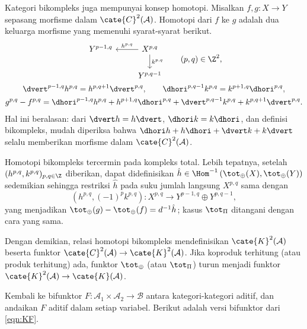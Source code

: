 Kategori bikompleks juga mempunyai konsep homotopi. Misalkan
$f,g:X\to Y$ sepasang morfisme dalam $\cate{C}^2(\mathcal{A})$. Homotopi
dari $f$ ke $g$ adalah dua keluarga morfisme yang memenuhi syarat-syarat
berikut. 
\begin{equation*}\begin{gathered}
\begin{tikzcd}
	Y^{p-1, q} & X^{p,q} \arrow[l, "{h^{p,q}}"'] \arrow[d, "{k^{p, q}}"] \\
	& Y^{p, q-1}
\end{tikzcd} \qquad (p,q) \in \Z^2 , \\
	\dvert^{p-1, q} h^{p, q} = h^{p, q+1} \dvert^{p, q}, \qquad \dhori^{p, q-1} k^{p,q} = k^{p+1, q} \dhori^{p,q}, \\
	g^{p,q} - f^{p, q} = \dhori^{p-1, q} h^{p,q} + h^{p+1, q} \dhori^{p,q} + \dvert^{p, q-1} k^{p,q} + k^{p, q+1} \dvert^{p,q}.
\end{gathered}\end{equation*}
Hal ini beralasan: dari $\dvert h=h\dvert$, $\dhori k=k\dhori$, dan definisi
bikompleks, mudah diperiksa bahwa
$\dhori h+h\dhori+\dvert k+k\dvert$ selalu memberikan morfisme dalam
$\cate{C}^2(\mathcal{A})$.

Homotopi bikompleks tercermin pada kompleks total. Lebih tepatnya, setelah
$(h^{p,q},k^{p,q})_{p,q\in\Z}$ diberikan, dapat didefinisikan
$\hat{h}\in\Hom^{-1}\left(\tot_{\oplus}(X),\tot_{\oplus}(Y)\right)$
sedemikian sehingga restriksi $\hat{h}$ pada suku jumlah langsung $X^{p,q}$
sama dengan
\[ \left( h^{p,q}, (-1)^p k^{p,q} \right): X^{p,q} \to Y^{p-1, q} \oplus Y^{p, q-1}, \]
yang menjadikan
$\tot_{\oplus}(g)-\tot_{\oplus}(f)=d^{-1}\hat{h}$; kasus $\tot_{\Pi}$
ditangani dengan cara yang sama.

Dengan demikian, relasi homotopi bikompleks mendefinisikan
$\cate{K}^2(\mathcal{A})$ beserta funktor
$\cate{C}^2(\mathcal{A})\to\cate{K}^2(\mathcal{A})$. Jika koproduk terhitung
(atau produk terhitung) ada, funktor $\tot_{\oplus}$ (atau $\tot_{\Pi}$)
turun menjadi funktor
$\cate{K}^2(\mathcal{A})\to\cate{K}(\mathcal{A})$.

Kembali ke bifunktor $F:\mathcal{A}_1\times\mathcal{A}_2\to\mathcal{B}$
antara kategori-kategori aditif, dan andaikan $F$ aditif dalam setiap
variabel. Berikut adalah versi bifunktor dari \eqref{eqn:KF}.

